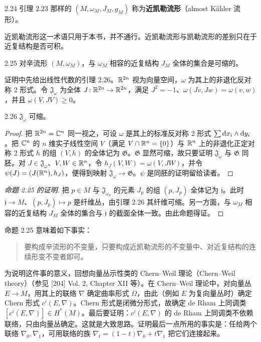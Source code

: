 \begin{definition}{2.24}
  引理 2.23 那样的 $(M,\omega_M,J_M,g_M)$ 称为\textbf{近凯勒流形}（almost Kähler 流形）。
\end{definition}

近凯勒流形这一术语只用于本书，并不通行。近凯勒流形与凯勒流形的差别只在于近复结构是否可积。

\begin{proposition}{2.25}
  对辛流形 $(M,\omega_M)$，与 $\omega_M$ 相容的近复结构 $J_M$ 全体的集合是可缩的。
\end{proposition}

证明中先给出线性代数的引理 2.26。$\mathbb{R}^{2n}$ 视为向量空间，$\omega$ 为其上的非退化反对称 2 形式。令 $\mathfrak{J}_\omega$ 为全体 $J\colon\mathbb{R}^{2n}\to\mathbb{R}^{2n}$，满足 $J^2=-1$、$\omega(Jv,Jw)=\omega(v,w)$，并且 $\omega(V,JV)\geq0$。

\begin{lemma*}{2.26}
  $\mathfrak{J}_\omega$ 可缩。
\end{lemma*}

\begin{proof}
  把 $\mathbb{R}^{2n}=\mathbb{C}^n$ 同一视之，可设 $\omega$ 是其上的标准反对称 2 形式 $\sum \mathrm{d} x_i\wedge\mathrm{d} y_i$。把 $\mathbb{C}^n$ 的 $n$ 维实子线性空间 $V$（满足 $V\cap\mathbb{R}^n=\{0\}$）与 $\mathbb{R}^n$ 上的非退化正定对称 2 形式 $h$ 的组 $(V,h)$ 的全体记为 $\mathfrak{G}$。$\mathfrak{G}$ 显然可缩，故只要证明 $\mathfrak{J}_\omega$ 与 $\mathfrak{G}$ 同胚。对 $J\in\mathfrak{J}_\omega$、$V,W\in\mathbb{R}^n$，令 $h_J(V,W)=\omega(V,JW)$，并令 $\psi(J)=(J(\mathbb{R}^n),h_J)$，便得到映射 $\mathfrak{J}_\omega\to\mathfrak{G}$。$\psi$ 是同胚的证明留给读者。
\end{proof}

\begin{proof}[命题 2.25 的证明]
  把 $p\in M$ 与 $\mathfrak{J}_{\omega_p}$ 的元素 $J_p$ 的组 $(p,J_p)$ 全体记为 $\mathfrak{j}$。此时 $\mathfrak{j}\to M$、$(p,J_p)\mapsto p$ 是纤维丛，由引理 2.26 其纤维可缩。另一方面，与 $\omega_M$ 相容的近复结构 $J_M$ 全体的集合与 $\mathfrak{j}$ 的截面全体一致。由此命题得证。
\end{proof}

命题 2.25 意味着如下事实：
\begin{quote}
  要构成辛流形的不变量，只要构成近凯勒流形的不变量中、对近复结构的连续形变不变者即可。
\end{quote}

为说明这件事的意义，回想向量丛示性类的 Chern–Weil 理论（Chern–Weil theory）（参见 [204] Vol. 2, Chapter XII 等）。在 Chern–Weil 理论中，对向量丛 $E\to M$，用其上的联络 $\nabla$ 确定曲率形式 $\Omega$，由此（例如 $E$ 为复向量丛时）确定 Chern 形式 $c^i(E,\nabla)$。Chern 形式是闭微分形式，故确定 de Rham 上同调类 $[c^i(E,\nabla)]\in H^*(M)$。最后要证明：$c^i(E,\nabla)$ 的 de Rham 上同调类不依赖联络，只由向量丛确定。这就是大致思路。证明最后一点所用的事实是：任给两个联络 $\nabla_0,\nabla_1$，可用联络的族 $\nabla_t=(1-t)\nabla_0+t\nabla_1$ 把它们连接起来。

